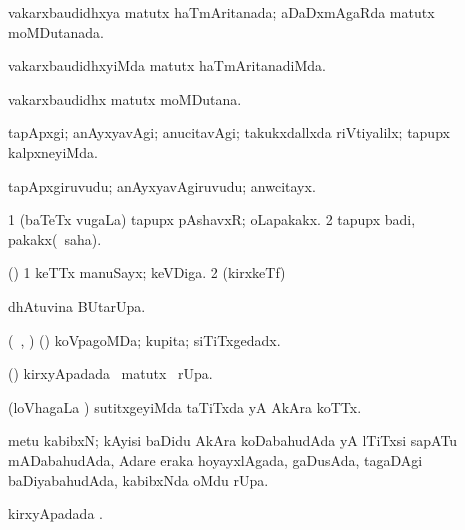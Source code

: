 {{{{{{\begin{center}
{{\bentry
{} 
\gl{\gu}
\expl{}
\bmng
vakarxbaudidhxya matutx haTmAritanada; aDaDxmAgaRda matutx moMDutanada. 
\emng
\eentry

\bentry
{} 
\gl{\kirxvi}
\expl{}
\bmng
vakarxbaudidhxyiMda matutx haTmAritanadiMda. 
\emng
\eentry

\bentry
{} 
\gl{\nA}
\expl{}
\bmng
vakarxbaudidhx matutx moMDutana. 
\emng
\eentry

\bentry
{} 
\gl{\kirxvi}
\expl{}
\bmng
tapApxgi; anAyxyavAgi; anucitavAgi; takukxdallxda riVtiyalilx; tapupx kalpxneyiMda. 
\emng
\eentry

\bentry
{} 
\gl{\nA}
\expl{}
\bmng
tapApxgiruvudu; anAyxyavAgiruvudu; anwcitayx. 
\emng
\eentry

\bentry
{} 
\gl{\nA}
\expl{}
\bmng
\bnum
\num{1} (baTeTx \mo vugaLa) tapupx pAshavxR; oLapakakx. 
\num{2} tapupx badi, pakakx(\rUpa\ saha). 
\enum
\emng
\eentry

\bentry
{} 
\gl{\nA}
\expl{}
\bmng
(\AmA) 
\bnum
\num{1} keTTx manuSayx; keVDiga. 
\num{2} (kirxkeTf)  
\enum
\emng
\eentry

\bentry
{} 
\gl{\kirx}
\expl{}
\bmng
{} dhAtuvina BUtarUpa. 
\emng
\eentry

\bentry
{} 
\gl{\gu}
\expl{}
\bmng
(\rUpa\, \kAparx, \hA) (\pArxparx) koVpagoMDa; kupita; siTiTxgedadx. 
\emng
\eentry

\bentry
{} 
\gl{\kirx}
\expl{}
\bmng
(\pArxparx)  kirxyApadada \BU\ matutx \BUkaq\ rUpa. 
\emng
\eentry

\bentry
{} 
\gl{\gu}
\expl{}
\bmng
(loVhagaLa \vi) sutitxgeyiMda taTiTxda yA AkAra koTTx. 
\emng
\eentry

\bentry
{} 
\gl{\nA}
\expl{}
\bmng
metu kabibxN; kAyisi baDidu AkAra koDabahudAda yA lTiTxsi sapATu mADabahudAda, Adare eraka hoyayxlAgada, gaDusAda, tagaDAgi baDiyabahudAda, kabibxNda oMdu rUpa. 
\emng
\eentry

\bentry
{} 
\gl{\kirx}
\expl{}
\bmng
{} kirxyApadada \BUkaq. 
\emng
\eentry

\bentry
{} 
\gl{\saMkiSx}
\expl{}
\bmng
\eng{(} \birx\  
\emng
\eentry

}}
\end{center}}}}}}}
